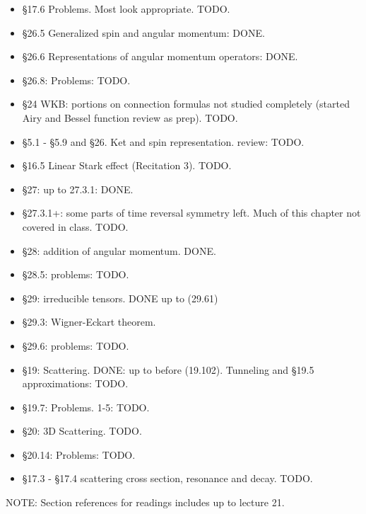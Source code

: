 \begin{itemize}
\item \S 17.6 Problems.  Most look appropriate.  TODO.
\item \S 26.5 Generalized spin and angular momentum: DONE.
\item \S 26.6 Representations of angular momentum operators: DONE.
\item \S 26.8: Problems: TODO.
\item \S 24 WKB: portions on connection formulas not studied completely (started Airy and Bessel function review as prep).  TODO.
\item \S 5.1 - \S 5.9 and \S 26.  Ket and spin representation.  review: TODO.
\item \S 16.5 Linear Stark effect (Recitation 3).  TODO.
\item \S 27: up to 27.3.1: DONE.
\item \S 27.3.1+: some parts of time reversal symmetry left.  Much of this chapter not covered in class.  TODO.
\item \S 28: addition of angular momentum.  DONE.
\item \S 28.5: problems: TODO.
\item \S 29: irreducible tensors.  DONE up to (29.61)
\item \S 29.3: Wigner-Eckart theorem.
\item \S 29.6: problems: TODO.
\item \S 19: Scattering.  DONE: up to before (19.102).  Tunneling and \S 19.5 approximations: TODO.
\item \S 19.7: Problems. 1-5: TODO.
\item \S 20: 3D Scattering. TODO.
\item \S 20.14: Problems: TODO.
\item \S 17.3 - \S 17.4 scattering cross section, resonance and decay.  TODO.
\end{itemize}

NOTE: Section references for readings includes up to lecture 21.
